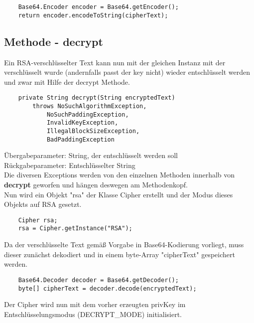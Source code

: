 \documentclass[12pt]{article}
\begin{document}
\begin{lstlisting}
    Base64.Encoder encoder = Base64.getEncoder();
    return encoder.encodeToString(cipherText);
\end{lstlisting}


\newpage



\subsection{Methode - decrypt}

Ein RSA-verschlüsselter Text kann nun mit der gleichen Instanz mit der verschlüsselt wurde (andernfalls passt der key nicht) wieder entschlüsselt werden und zwar mit Hilfe der decrypt Methode.

\begin{lstlisting}
    private String decrypt(String encryptedText)
        throws NoSuchAlgorithmException,
            NoSuchPaddingException,
            InvalidKeyException,
            IllegalBlockSizeException,
            BadPaddingException
\end{lstlisting}

Übergabeparameter: String, der entschlüsselt werden soll \\
Rückgabeparameter: Entschlüsselter String \\

Die diversen Exceptions werden von den einzelnen Methoden innerhalb von \textbf{decrypt} geworfen und hängen deswegen am Methodenkopf. \\

Nun wird ein Objekt "rsa" der Klasse Cipher erstellt und der Modus dieses Objekts auf RSA gesetzt.

\begin{lstlisting}
    Cipher rsa;
    rsa = Cipher.getInstance("RSA");
\end{lstlisting}

Da der verschlüsselte Text gemäß Vorgabe in Base64-Kodierung vorliegt, muss dieser zunächst dekodiert und in einem byte-Array "cipherText" gespeichert werden.

\begin{lstlisting}
    Base64.Decoder decoder = Base64.getDecoder();
    byte[] cipherText = decoder.decode(encryptedText);
\end{lstlisting}

Der Cipher wird nun mit dem vorher erzeugten privKey im Entschlüsselungsmodus (DECRYPT\_MODE) initialisiert.
\end{document}
